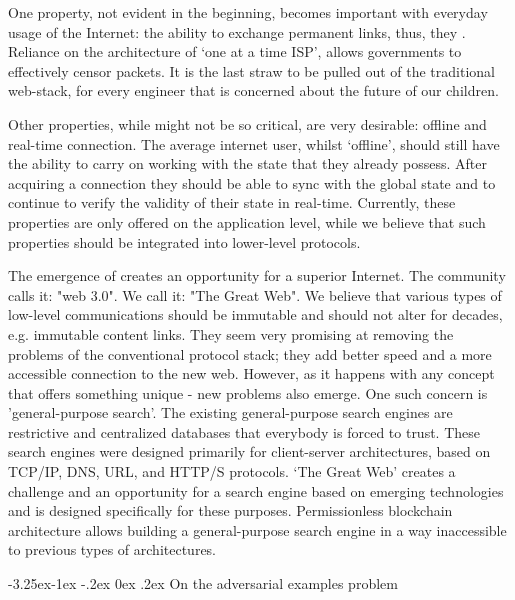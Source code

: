 \documentclass[8pt,oneside]{amsart}
\makeatletter
\newcommand{\linkgreen}[2]{\href{#1}{\color{green}{#2}}}
\renewcommand\subsection{\@startsection{subsection}{2}{\z@}%
                                     {-3.25ex\@plus -1ex \@minus -.2ex}%
                                     {0ex \@plus .2ex}%
                                     {\play\Large}}%
\newcommand{\titleSection}[1]{\subsection{#1}}
\makeatother
\begin{document}
\begin{Abstract}
One property, not evident in the beginning, becomes important with everyday usage of the Internet: the ability to exchange permanent links, thus, they \linkgreen{https://ipfs.io/ipfs/QmNhaUrhM7KcWzFYdBeyskoNyihrpHvUEBQnaddwPZigcN}{would not break after time had passed}. Reliance on the architecture of ‘one at a time ISP’, allows governments to effectively censor packets. It is the last straw to be pulled out of the traditional web-stack, for every engineer that is concerned about the future of our children.

Other properties, while might not be so critical, are very desirable: offline and real-time connection. The average internet user, whilst ‘offline’, should still have the ability to carry on working with the state that they already possess. After acquiring a connection they should be able to sync with the global state and to continue to verify the validity of their state in real-time. Currently, these properties are only offered on the application level, while we believe that such properties should be integrated into lower-level protocols.

The emergence of \linkgreen{https://ipfs.io/ipfs/Qmf3eHU9idMUZgx6MKhCsFPWL24X9pDUi2ECqyH8UtBAMQ}{a brand-new web-stack} creates an opportunity for a superior Internet. The community calls it: "web 3.0". We call it: "The Great Web". We believe that various types of low-level communications should be immutable and should not alter for decades, e.g. immutable content links. They seem very promising at removing the problems of the conventional protocol stack; they add better speed and a more accessible connection to the new web. However, as it happens with any concept that offers something unique - new problems also emerge. One such concern is 'general-purpose search'. The existing general-purpose search engines are restrictive and centralized databases that everybody is forced to trust. These search engines were designed primarily for client-server architectures, based on TCP/IP, DNS, URL, and HTTP/S protocols. ‘The Great Web’ creates a challenge and an opportunity for a search engine based on emerging technologies and is designed specifically for these purposes. Permissionless blockchain architecture allows building a general-purpose search engine in a way inaccessible to previous types of architectures.

\titleSection{On the adversarial examples problem}\label{On the adversarial examples problem}


\end{Abstract}
\end{document}
